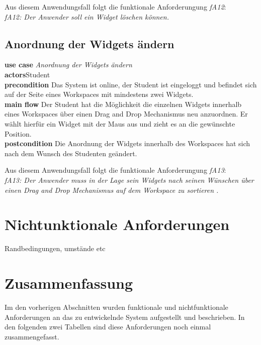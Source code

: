 Aus diesem Anwendungsfall folgt die funktionale Anforderungung \emph{fA12}:\\
\emph{fA12: Der Anwender soll ein Widget löschen können.}\\
 
\subsection{Anordnung der Widgets ändern}
\textbf{use case} \emph{Anordnung der Widgets ändern}\\
\textbf{actors}Student\\
\textbf{precondition} Das System ist online, der Student ist eingeloggt und befindet sich auf der Seite eines Workspaces mit mindestens zwei Widgets.\\
\textbf{main flow} Der Student hat die Möglichkeit die einzelnen Widgets innerhalb eines Workspaces über einen Drag and Drop Mechanismus neu anzuordnen. Er wählt hierfür ein Widget mit der Maus aus und zieht es an die gewünschte Position.\\
\textbf{postcondition} Die Anordnung der Widgets innerhalb des Workspaces hat sich nach dem Wunsch des Studenten geändert.
 
Aus diesem Anwendungsfall folgt die funktionale Anforderungung \emph{fA13}:\\
\emph{fA13: Der Anwender muss in der Lage sein Widgets nach seinen Wünschen über einen Drag and Drop Mechanismus auf dem Workspace zu sortieren .}\\
 
\section{Nichtunktionale Anforderungen}\label{section:nichtfunktionale_anforderunge}
Randbedingungen, umstände etc
 
\section{Zusammenfassung}
Im den vorherigen Abschnitten wurden funktionale und nichtfunktionale Anforderungen an das zu entwickelnde System aufgestellt und beschrieben. In den folgenden zwei Tabellen sind diese Anforderungen noch einmal zusammengefasst.

